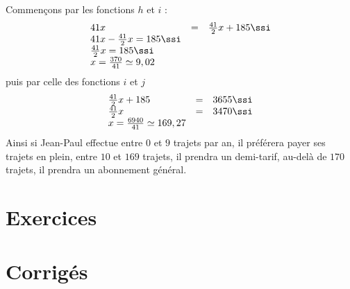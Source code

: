 \begin{exemple}
Commençons par les fonctions $h$ et $i$ :
$$
\begin{array}{lcl}
41 x &=& \frac{41}{2} x + 185 \ssi \\
41x - \frac{41}{2}x = 185 \ssi \\
\frac{41}{2} x = 185 \ssi \\
x = \frac{370}{41} \simeq 9,02
\end{array}
$$
puis par celle des fonctions $i$ et $j$
$$
\begin{array}{lcl}
\frac{41}{2}x + 185 &=& 3655 \ssi \\
\frac{41}{2} x &=& 3470 \ssi \\
x = \frac{6940}{41} \simeq 169,27
\end{array}
$$
Ainsi si Jean-Paul effectue entre $0$ et $9$ trajets par an, il préférera payer ses trajets en plein, entre $10$ et $169$ trajets, il prendra un demi-tarif, au-delà de $170$ trajets, il prendra un abonnement général.
\end{exemple}

\section{Exercices}



\section{Corrigés}

